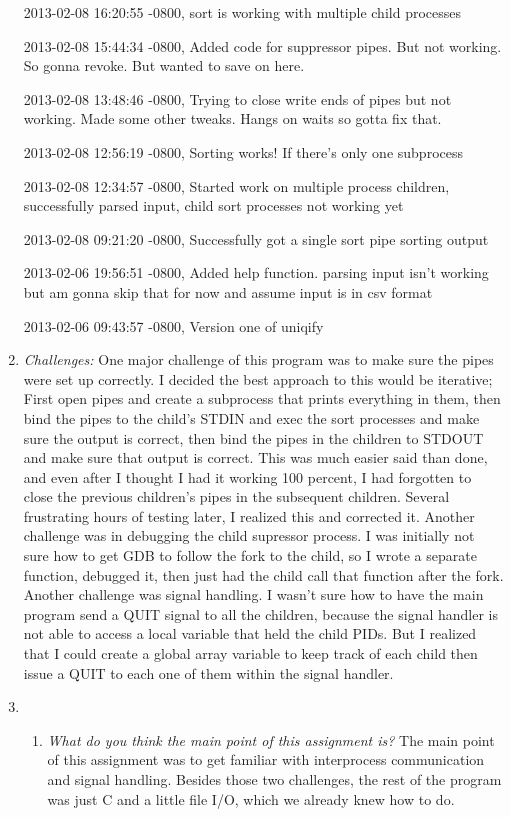 \documentclass[letterpaper,10pt,titlepage]{article}
\begin{document}
\begin{enumerate}
2013-02-08 16:20:55 -0800, sort is working with multiple child processes

2013-02-08 15:44:34 -0800, Added code for suppressor pipes. But not working. So gonna revoke. But wanted to save on here.

2013-02-08 13:48:46 -0800, Trying to close write ends of pipes but not working. Made some other tweaks. Hangs on waits so gotta fix that.

2013-02-08 12:56:19 -0800, Sorting works! If there's only one subprocess

2013-02-08 12:34:57 -0800, Started work on multiple process children, successfully parsed input, child sort processes not working yet

2013-02-08 09:21:20 -0800, Successfully got a single sort pipe sorting output

2013-02-06 19:56:51 -0800, Added help function. parsing input isn't working but am gonna skip that for now and assume input is in csv format

2013-02-06 09:43:57 -0800, Version one of uniqify


\item \emph{Challenges:}
One major challenge of this program was to make sure the pipes were set up correctly. I decided the best approach to this would be iterative; First open pipes and create a subprocess that prints everything in them, then bind the pipes to the child's STDIN and exec the sort processes and make sure the output is correct, then bind the pipes in the children to STDOUT and make sure that output is correct. This was much easier said than done, and even after I thought I had it working 100 percent, I had forgotten to close the previous children's pipes in the subsequent children. Several frustrating hours of testing later, I realized this and corrected it. Another challenge was in debugging the child supressor process. I was initially not sure how to get GDB to follow the fork to the child, so I wrote a separate function, debugged it, then just had the child call that function after the fork. Another challenge was signal handling. I wasn't sure how to have the main program send a QUIT signal to all the children, because the signal handler is not able to access a local variable that held the child PIDs. But I realized that I could create a global array variable to keep track of each child then issue a QUIT to each one of them within the signal handler.

\item \begin{enumerate}
	\item \emph{What do you think the main point of this assignment is?} The main point of this assignment was to get familiar with interprocess communication and signal handling. Besides those two challenges, the rest of the program was just C and a little file I/O, which we already knew how to do.


\end{enumerate}
\end{enumerate}
\end{document}
